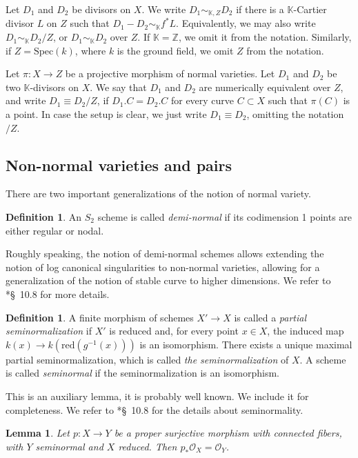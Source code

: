 \documentclass{amsart}
\newcommand{\cO}{\mathcal{O}}
\newtheorem{Lemma}[theorem]{Lemma}
\theoremstyle{definition}
\newtheorem{Def}[theorem]{Definition}
\newcommand{\rar}{\rightarrow}
\newcommand{\zz}{\mathbb{Z}}
\begin{document}
Let $D_1$ and $D_2$ be divisors on $X$.
We write $D_1 \sim_{\mathbb K ,Z} D_2$ if there is a $\mathbb{K}$-Cartier divisor $L$ on $Z$ such that $D_1 - D_2 \sim _{\mathbb K}f^\ast L$.
Equivalently, we may also write $D_1 \sim_{\mathbb{K}} D_2/Z$, or $D_1 \sim_{\mathbb{K}} D_2$ over $Z$.
If $\mathbb{K}=\zz$, we omit it from the notation.
Similarly, if $Z= \mathrm{Spec}(k)$, where $k$ is the ground field, we omit $Z$ from the notation.


Let $\pi \colon X \rar Z$ be a projective morphism of normal varieties.
Let $D_1$ and $D_2$ be two $\mathbb{K}$-divisors on $X$.
We say that $D_1$ and $D_2$ are numerically equivalent over $Z$, and write $D_1 \equiv D_2/Z$, if $D_1 . C = D_2 . C$ for every curve $C \subset X$ such that $\pi(C)$ is a point.
In case the setup is clear, we just write $D_1 \equiv D_2$, omitting the notation $/Z$.

\subsection{Non-normal varieties and pairs} There are two important generalizations of the notion of normal variety.
\begin{Def}
An $S_2$ scheme is called \emph{demi-normal} if its codimension 1 points are either regular or nodal.\end{Def}
Roughly speaking, the notion of demi-normal schemes allows extending the notion of log canonical singularities to non-normal varieties, allowing for a generalization of the notion of stable curve to higher dimensions.
We refer to \cite{kol_new}*{\S~10.8} for more details.

\begin{Def}A finite morphism of schemes $X' \rar X$ is called a \emph{partial seminormalization} if $X'$ is reduced and, for every point $x \in X$,  the induced map $k(x) \rar k(\mathrm{red}(g^{-1}(x)))$ is an isomorphism.
There exists a unique maximal partial seminormalization, which is called \emph{the seminormalization} of $X$.
A scheme is called \emph{seminormal} if the seminormalization is an isomorphism.\end{Def}


This is an auxiliary lemma, it is probably well known. We include it for completeness.
We refer to \cite{kol_new}*{\S~10.8} for the details about seminormality.

\begin{Lemma}\label{lemma:connected:fivers:vs:cohomol:connected:fibers}
Let $p \colon X\to Y$ be a proper surjective morphism with connected fibers, with $Y$ seminormal and $X$ reduced.
Then $p_*\cO_X = \cO_Y$.
\end{Lemma}
\end{document}
